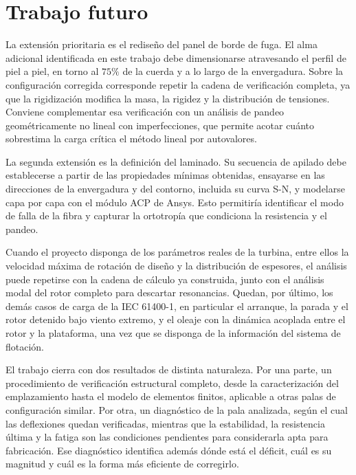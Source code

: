 \section{Trabajo futuro}

La extensión prioritaria es el rediseño del panel de borde de fuga. El alma adicional identificada en este trabajo debe dimensionarse atravesando el perfil de piel a piel, en torno al $75\%$ de la cuerda y a lo largo de la envergadura. Sobre la configuración corregida corresponde repetir la cadena de verificación completa, ya que la rigidización modifica la masa, la rigidez y la distribución de tensiones. Conviene complementar esa verificación con un análisis de pandeo geométricamente no lineal con imperfecciones, que permite acotar cuánto sobrestima la carga crítica el método lineal por autovalores.

La segunda extensión es la definición del laminado. Su secuencia de apilado debe establecerse a partir de las propiedades mínimas obtenidas, ensayarse en las direcciones de la envergadura y del contorno, incluida su curva S-N, y modelarse capa por capa con el módulo ACP de Ansys. Esto permitiría identificar el modo de falla de la fibra y capturar la ortotropía que condiciona la resistencia y el pandeo.

Cuando el proyecto disponga de los parámetros reales de la turbina, entre ellos la velocidad máxima de rotación de diseño y la distribución de espesores, el análisis puede repetirse con la cadena de cálculo ya construida, junto con el análisis modal del rotor completo para descartar resonancias. Quedan, por último, los demás casos de carga de la IEC 61400-1, en particular el arranque, la parada y el rotor detenido bajo viento extremo, y el oleaje con la dinámica acoplada entre el rotor y la plataforma, una vez que se disponga de la información del sistema de flotación.

El trabajo cierra con dos resultados de distinta naturaleza. Por una parte, un procedimiento de verificación estructural completo, desde la caracterización del emplazamiento hasta el modelo de elementos finitos, aplicable a otras palas de configuración similar. Por otra, un diagnóstico de la pala analizada, según el cual las deflexiones quedan verificadas, mientras que la estabilidad, la resistencia última y la fatiga son las condiciones pendientes para considerarla apta para fabricación. Ese diagnóstico identifica además dónde está el déficit, cuál es su magnitud y cuál es la forma más eficiente de corregirlo.
